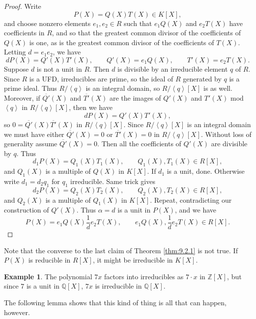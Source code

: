 \documentclass{article}
\newcommand{\Z}{\mathbb{Z}}
\newcommand{\Q}{\mathbb{Q}}
\newcommand{\rb}[1]{\left( #1 \right)}
\renewcommand{\sb}[1]{\left[ #1 \right]}
\newcommand{\ab}[1]{\left\langle #1 \right\rangle}
\theoremstyle{definition}\newtheorem{definition}{Definition}[subsection]
\theoremstyle{definition}\newtheorem{remark}[definition]{Remark}
\theoremstyle{definition}\newtheorem*{example}{Example}
\theoremstyle{definition}\newtheorem*{note}{Note}
\begin{document}
\begin{proof}
Write
$$ P\rb{X} = Q\rb{X}T\rb{X} \in K\sb{X}, $$
and choose nonzero elements $ e_1, e_2 \in R $ such that $ e_1Q\rb{X} $ and $ e_2T\rb{X} $ have coefficients in $ R $, and so that the greatest common divisor of the coefficients of $ Q\rb{X} $ is one, as is the greatest common divisor of the coefficients of $ T\rb{X} $. Letting $ d = e_1e_2 $, we have
$$ dP\rb{X} = Q'\rb{X}T'\rb{X}, \qquad Q'\rb{X} = e_1Q\rb{X}, \qquad T'\rb{X} = e_2T\rb{X}. $$
Suppose $ d $ is not a unit in $ R $. Then $ d $ is divisible by an irreducible element $ q $ of $ R $. Since $ R $ is a UFD, irreducibles are prime, so the ideal of $ R $ generated by $ q $ is a prime ideal. Thus $ R / \ab{q} $ is an integral domain, so $ R / \ab{q}\sb{X} $ is as well. Moreover, if $ \overline{Q'}\rb{X} $ and $ \overline{T'}\rb{X} $ are the images of $ Q'\rb{X} $ and $ T'\rb{X} $ mod $ \ab{q} $ in $ R / \ab{q}\sb{X} $, then we have
$$ dP\rb{X} = Q'\rb{X}T'\rb{X}, $$
so $ 0 = \overline{Q'}\rb{X}\overline{T'}\rb{X} $ in $ R / \ab{q}\sb{X} $. Since $ R / \ab{q}\sb{X} $ is an integral domain we must have either $ \overline{Q'}\rb{X} = 0 $ or $ \overline{T'}\rb{X} = 0 $ in $ R / \ab{q}\sb{X} $. Without loss of generality assume $ \overline{Q'}\rb{X} = 0 $. Then all the coefficients of $ Q'\rb{X} $ are divisible by $ q $. Thus
$$ d_1P\rb{X} = Q_1\rb{X}T_1\rb{X}, \qquad Q_1\rb{X}, T_1\rb{X} \in R\sb{X}, $$
and $ Q_1\rb{X} $ is a multiple of $ Q\rb{X} $ in $ K\sb{X} $. If $ d_1 $ is a unit, done. Otherwise write $ d_1 = d_2q_1 $ for $ q_1 $ irreducible. Same trick gives
$$ d_2P\rb{X} = Q_2\rb{X}T_2\rb{X}, \qquad Q_2\rb{X}, T_2\rb{X} \in R\sb{X}, $$
and $ Q_2\rb{X} $ is a multiple of $ Q_1\rb{X} $ in $ K\sb{X} $. Repeat, contradicting our construction of $ Q'\rb{X} $. Thus $ \alpha = d $ is a unit in $ P\rb{X} $, and we have
$$ P\rb{X} = e_1Q\rb{X}\dfrac{1}{d}e_2T\rb{X}, \qquad e_1Q\rb{X}, \dfrac{1}{d}e_2T\rb{X} \in R\sb{X}. $$
\end{proof}

Note that the converse to the last claim of Theorem \ref{thm:9.2.1} is not true. If $ P\rb{X} $ is reducible in $ R\sb{X} $, it might be irreducible in $ K\sb{X} $.

\begin{example}
The polynomial $ 7x $ factors into irreducibles as $ 7 \cdot x $ in $ \Z\sb{X} $, but since $ 7 $ is a unit in $ \Q\sb{X} $, $ 7x $ is irreducible in $ \Q\sb{X} $.
\end{example}

The following lemma shows that this kind of thing is all that can happen, however.
\end{document}
